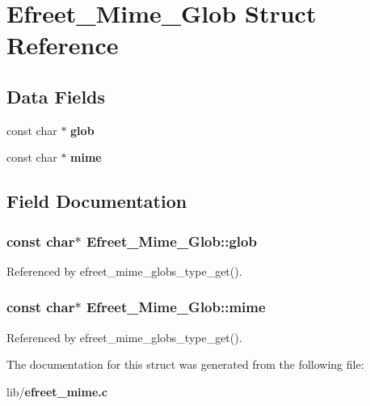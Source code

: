 \section{Efreet\_\-Mime\_\-Glob Struct Reference}
\label{structEfreet__Mime__Glob}
\subsection*{Data Fields}
\begin{CompactItemize}
\item 
const char $\ast$ {\bf glob}
\item 
const char $\ast$ {\bf mime}
\end{CompactItemize}


\subsection{Field Documentation}
\subsubsection[glob]{\setlength{\rightskip}{0pt plus 5cm}const char$\ast$ {\bf Efreet\_\-Mime\_\-Glob::glob}}\label{structEfreet__Mime__Glob_6d7e45d5470bd6f10fc6ff15401e6ab6}




Referenced by efreet\_\-mime\_\-globs\_\-type\_\-get().
\subsubsection[mime]{\setlength{\rightskip}{0pt plus 5cm}const char$\ast$ {\bf Efreet\_\-Mime\_\-Glob::mime}}\label{structEfreet__Mime__Glob_9fdb0d988cc41acd5e3f4362a18113ba}




Referenced by efreet\_\-mime\_\-globs\_\-type\_\-get().

The documentation for this struct was generated from the following file:\begin{CompactItemize}
\item 
lib/{\bf efreet\_\-mime.c}\end{CompactItemize}
